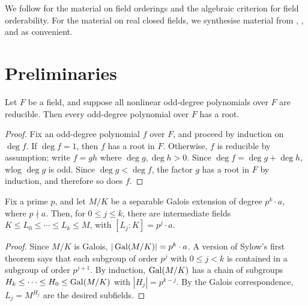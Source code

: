 %

We follow \cite{Lam1984} for the material on field orderings and the algebraic criterion for field orderability. For the material on real closed fields, we synthesise material from \cite{Bochnak1998}, \cite{Knebusch2022}, \cite{Jacobson2012I} and \cite{Jacobson2012II} as convenient. 

\section{Preliminaries}

\begin{lemma}
  \label{lem:odd_deg_red_imp_root}
  Let $F$ be a field, and suppose all nonlinear odd-degree polynomials over $F$ are reducible. Then every odd-degree polynomial over $F$ has a root.
\end{lemma}
\begin{proof}
  Fix an odd-degree polynomial $f$ over $F$, and proceed by induction on $\deg f$. If $\deg f=1$, then $f$ has a root in $F$. Otherwise, $f$ is reducible by assumption; write $f=gh$ where $\deg g,\deg h>0$. Since $\deg f=\deg g+\deg h$, wlog $\deg g$ is odd. Since $\deg g<\deg f$, the factor $g$ has a root in $F$ by induction, and therefore so does $f$.
\end{proof}

\begin{lemma}
  \label{lem:sylow_galois}
  Fix a prime $p$, and let $M/K$ be a separable Galois extension of degree $p^k\cdot a$, where $p\nmid a$. Then, for $0\leq j\leq k$, there are intermediate fields $K\leq L_0\leq\cdots\leq L_k\leq M$, with $[L_j:K]=p^j\cdot a$.
\end{lemma}
\begin{proof}
  Since $M/K$ is Galois, $|\operatorname{Gal}(M/K)|=p^k\cdot a$. A version of Sylow's first theorem says that each subgroup of order $p^j$ with $0\leq j<k$ is contained in a subgroup of order $p^{j+1}$. By induction, $\operatorname{Gal}(M/K)$ has a chain of subgroups $H_k\leq\cdots\leq H_0\leq \operatorname{Gal}(M/K)$ with $|H_j|=p^{k-j}$. By the Galois correspondence, $L_j=M^{H_j}$ are the desired subfields.
\end{proof}

